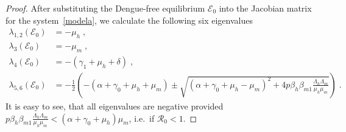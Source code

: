 \documentclass[10pt,a4paper]{amsart}
\begin{document}
\begin{proof}
After substituting the Dengue-free equilibrium $\mathcal{E}_0$ into the Jacobian matrix for the system~\eqref{modela}, we calculate the following six eigenvalues
\begin{align*}
    \lambda_{1,2}(\mathcal{E}_0) &= -\mu_h\;,\\
    \lambda_3(\mathcal{E}_0) &= -\mu_m\;,\\
    \lambda_4(\mathcal{E}_0) &= -(\gamma_1+\mu_h+\delta)\;, \\
    \lambda_{5,6}(\mathcal{E}_0) &= -\frac{1}{2} \left( -(\alpha+\gamma_0+\mu_h+\mu_m) \pm \sqrt{(\alpha+\gamma_0+\mu_h-\mu_m)^2+4p\beta_h \beta_{m1}\frac{\Lambda_h\Lambda_m}{\mu_h\mu_m}} \right)\;.
\end{align*}
It is easy to see, that all eigenvalues are negative provided $p\beta_h \beta_{m1}\frac{\Lambda_h\Lambda_m}{\mu_h\mu_m} < (\alpha+\gamma_0+\mu_h)\mu_m$, i.e.~if $\mathcal{R}_0<1$.

%
%
%


\end{proof}
\end{document}
